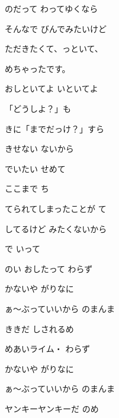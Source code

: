 \documentclass[a4paper,tate,twocolumn,12pt]{ltjtarticle}
\begin{document}
\begin{flushleft}
\begin{minipage}{\linewidth}
のだって わってゆくなら

そんなで びんでみたいけど

ただきたくて、っといて、

めちゃったです。

おしといてよ いといてよ
\end{minipage}

\vspace{2em}

\noindent\begin{minipage}{\linewidth}
「どうしよ？」も

きに「までだっけ？」すら

きせない ないから

でいたい せめて

ここまで ち

てられてしまったことが て

してるけど みたくないから

で いって
\end{minipage}

\vspace{2em}

\noindent\begin{minipage}{\linewidth}
のい おしたって わらず

かないや がりなに

ぁ～ぶっていいから のまんま

ききだ しされるめ

めあいライム・ わらず

かないや がりなに

ぁ～ぶっていいから のまんま

ヤンキーヤンキーだ のめ


\end{minipage}
\end{flushleft}
\end{document}
